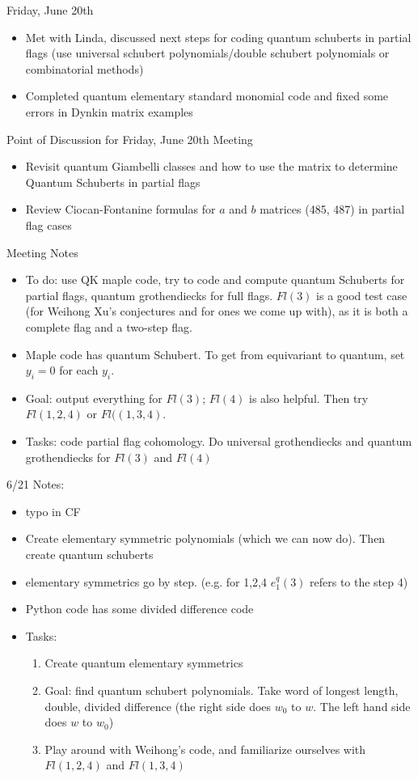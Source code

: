 Friday, June 20th
\begin{itemize}
    \item Met with Linda, discussed next steps for coding quantum schuberts in partial flags (use universal schubert polynomials/double schubert polynomials or combinatorial methods)
    \item Completed quantum elementary standard monomial code and fixed some errors in Dynkin matrix examples
\end{itemize}


Point of Discussion for Friday, June 20th Meeting
\begin{itemize}
    \item Revisit quantum Giambelli classes and how to use the matrix to determine Quantum Schuberts in partial flags
    \item Review Ciocan-Fontanine formulas for $a$ and $b$ matrices (485, 487) in partial flag cases
\end{itemize}


Meeting Notes
\begin{itemize}
    \item To do: use QK maple code, try to code and compute quantum Schuberts for partial flags, quantum grothendiecks for full flags. $Fl(3)$ is a good test case (for Weihong Xu's conjectures and for ones we come up with), as it is both a complete flag and a two-step flag. 
    \item Maple code has quantum Schubert. To get from equivariant to quantum, set $y_i = 0$ for each $y_i$.
    \item Goal: output everything for $Fl(3)$; $Fl(4)$ is also helpful. Then try $Fl(1,2,4)$ or $Fl((1,3,4)$.
    \item Tasks: code partial flag cohomology. Do universal grothendiecks and quantum grothendiecks for $Fl(3)$ and $Fl(4)$
\end{itemize}

6/21 Notes:
\begin{itemize}
    \item typo in CF
    \item Create elementary symmetric polynomials (which we can now do). Then create quantum schuberts
    \item elementary symmetrics go by step. (e.g. for 1,2,4 $e_1^q(3)$ refers to the step 4)
    \item Python code has some divided difference code
    \item Tasks:
    \begin{enumerate}
        \item Create quantum elementary symmetrics
        \item Goal: find quantum schubert polynomials. Take word of longest length, double, divided difference (the right side does $w_0$ to $w$. The left hand side does $w$ to $w_0$) 
        \item Play around with Weihong's code, and familiarize ourselves with $Fl(1,2,4)$ and $Fl(1,3,4)$
    \end{enumerate}
\end{itemize}

